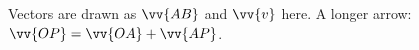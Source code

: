 \documentclass{article}
\begin{document}
Vectors are drawn as $\vv{AB}$ and $\vv{v}$ here.
A longer arrow: $\vv{OP} = \vv{OA} + \vv{AP}$.
\end{document}
